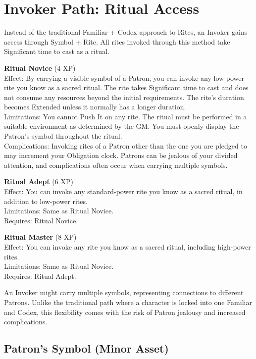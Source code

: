 \documentclass[12pt,twoside]{book}
\begin{document}
\section*{Invoker Path: Ritual Access}

Instead of the traditional Familiar + Codex approach to Rites, an Invoker gains access through Symbol + Rite. All rites invoked through this method take Significant time to cast as a ritual.

\textbf{Ritual Novice} (4 XP)\\
Effect: By carrying a visible symbol of a Patron, you can invoke any low-power rite you know as a sacred ritual. The rite takes Significant time to cast and does not consume any resources beyond the initial requirements. The rite's duration becomes Extended unless it normally has a longer duration.\\
Limitations: You cannot Push It on any rite. The ritual must be performed in a suitable environment as determined by the GM. You must openly display the Patron's symbol throughout the ritual.\\
Complications: Invoking rites of a Patron other than the one you are pledged to may increment your Obligation clock. Patrons can be jealous of your divided attention, and complications often occur when carrying multiple symbols.

\textbf{Ritual Adept} (6 XP)\\
Effect: You can invoke any standard-power rite you know as a sacred ritual, in addition to low-power rites.\\
Limitations: Same as Ritual Novice.\\
Requires: Ritual Novice.

\textbf{Ritual Master} (8 XP)\\
Effect: You can invoke any rite you know as a sacred ritual, including high-power rites.\\
Limitations: Same as Ritual Novice.\\
Requires: Ritual Adept.

An Invoker might carry multiple symbols, representing connections to different Patrons. Unlike the traditional path where a character is locked into one Familiar and Codex, this flexibility comes with the risk of Patron jealousy and increased complications.

\subsection*{Patron’s Symbol (Minor Asset)}
\end{document}

